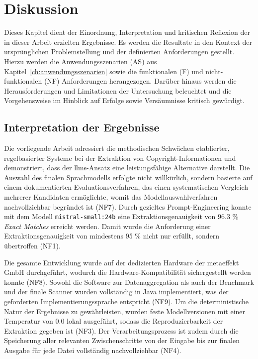 \chapter{Diskussion}\label{ch:diskussion}

Dieses Kapitel dient der Einordnung, Interpretation und kritischen Reflexion der in dieser Arbeit erzielten Ergebnisse.
Es werden die Resultate in den Kontext der ursprünglichen Problemstellung und der definierten Anforderungen gestellt.
Hierzu werden die Anwendungsszenarien (AS) aus Kapitel~\ref{ch:anwendungsszenarien} sowie die funktionalen (F) und nicht-funktionalen (NF) Anforderungen herangezogen.
Darüber hinaus werden die Herausforderungen und Limitationen der Untersuchung beleuchtet und die Vorgehensweise im Hinblick auf Erfolge sowie Versäumnisse kritisch gewürdigt.


\section{Interpretation der Ergebnisse}

Die vorliegende Arbeit adressiert die methodischen Schwächen etablierter, regelbasierter Systeme bei der Extraktion von Copyright-Informationen und demonstriert, dass der \glspl{llm}-Ansatz eine leistungsfähige Alternative darstellt.
Die Auswahl des finalen Sprachmodells erfolgte nicht willkürlich, sondern basierte auf einem dokumentierten Evaluationsverfahren, das einen systematischen Vergleich mehrerer Kandidaten ermöglichte, womit das Modellauswahlverfahren nachvollziehbar begründet ist (NF7).
Durch gezieltes Prompt-Engineering konnte mit dem Modell \texttt{mistral-small:24b} eine Extraktionsgenauigkeit von \num{96,3} \% \textit{Exact Matches} erreicht werden.
Damit wurde die Anforderung einer Extraktionsgenauigkeit von mindestens \num{95} \% nicht nur erfüllt, sondern übertroffen (NF1).

Die gesamte Entwicklung wurde auf der dedizierten Hardware der metaeffekt GmbH durchgeführt, wodurch die Hardware-Kompatibilität sichergestellt werden konnte (NF8).
Sowohl die Software zur Datenaggregation als auch der Benchmark und der finale Scanner wurden vollständig in Java implementiert, was der geforderten Implementierungssprache entspricht (NF9).
Um die deterministische Natur der Ergebnisse zu gewährleisten, wurden feste Modellversionen mit einer Temperatur von \num{0.0} lokal ausgeführt, sodass die Reproduzierbarkeit der Extraktion gegeben ist (NF3).
Der Verarbeitungsprozess ist zudem durch die Speicherung aller relevanten Zwischenschritte von der Eingabe bis zur finalen Ausgabe für jede Datei vollständig nachvollziehbar (NF4).

